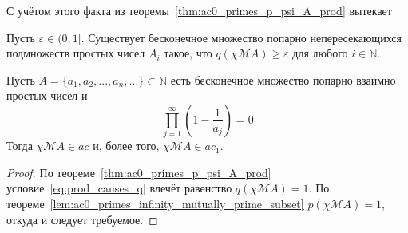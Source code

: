 С учётом этого факта
из теоремы~\ref{thm:ac0_primes_p_psi_A_prod} вытекает
\begin{lemma}
	Пусть $\varepsilon \in  (0; 1{]}$.
	Существует бесконечное множество попарно непересекающихся подмножеств простых чисел
	$A_i$ такое, что $q(\chi\mathscr{M}A)\geq\varepsilon$ для любого $i\in\mathbb{N}$.
\end{lemma}



\begin{theorem}
	Пусть $A=\{a_1, a_2, ..., a_n, ...\}\subset\mathbb{N}$ есть бесконечное множество попарно взаимно простых чисел
	и
	\begin{equation}
		\label{eq:prod_causes_q}
		\prod_{j=1}^\infty \left(1-\frac{1}{a_j}\right) = 0
	\end{equation}
	Тогда $\chi\mathscr{M}A\in ac$ и, более того, $\chi\mathscr{M}A\in ac_1$.
\end{theorem}

\begin{proof}
	По теореме~\ref{thm:ac0_primes_p_psi_A_prod} условие~\eqref{eq:prod_causes_q} влечёт равенство $q(\chi\mathscr{M}A)=1$.
	По теореме~\ref{lem:ac0_primes_infinity_mutually_prime_subset} $p(\chi\mathscr{M}A)=1$,
	откуда и следует требуемое.
\end{proof}
